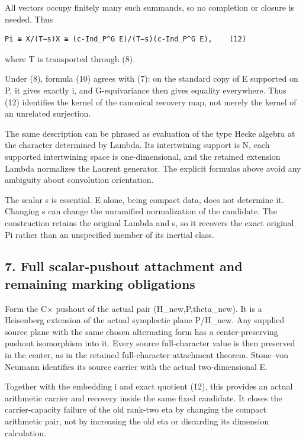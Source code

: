 All vectors occupy finitely many such summands, so no completion or
closure is needed. Thus

\begin{Verbatim}[fontsize=\small,breaklines=true,breakanywhere=true]
Pi ≅ X/(T−s)X ≅ (c-Ind_P^G E)/(T−s)(c-Ind_P^G E),    (12)
\end{Verbatim}

where T is transported through (8).

Under (8), formula (10) agrees with (7): on the standard copy of E
supported on P, it gives exactly i, and G-equivariance then gives
equality everywhere. Thus (12) identifies the kernel of the canonical
recovery map, not merely the kernel of an unrelated surjection.

The same description can be phrased as evaluation of the type Hecke
algebra at the character determined by Lambda. Its intertwining support
is N, each supported intertwining space is one-dimensional, and the
retained extension Lambda normalizes the Laurent generator. The explicit
formulas above avoid any ambiguity about convolution orientation.

The scalar s is essential. E alone, being compact data, does not
determine it. Changing s can change the unramified normalization of the
candidate. The construction retains the original Lambda and s, so it
recovers the exact original Pi rather than an unspecified member of its
inertial class.

\hypertarget{rank~2-full-scalar-pushout-attachment-and-remaining-marking-obligations}{%
\subsection{7. Full scalar-pushout attachment and remaining marking
obligations}\label{rank~2-full-scalar-pushout-attachment-and-remaining-marking-obligations}}

Form the C× pushout of the actual pair (H\_new,P,theta\_new). It is a
Heisenberg extension of the actual symplectic plane P/H\_new. Any
supplied source plane with the same chosen alternating form has a
center-preserving pushout isomorphism into it. Every source
full-character value is then preserved in the center, as in the retained
full-character attachment theorem. Stone--von Neumann identifies its
source carrier with the actual two-dimensional E.

Together with the embedding i and exact quotient (12), this provides an
actual arithmetic carrier and recovery inside the same fixed candidate.
It closes the carrier-capacity failure of the old rank-two eta by
changing the compact arithmetic pair, not by increasing the old eta or
discarding its dimension calculation.


